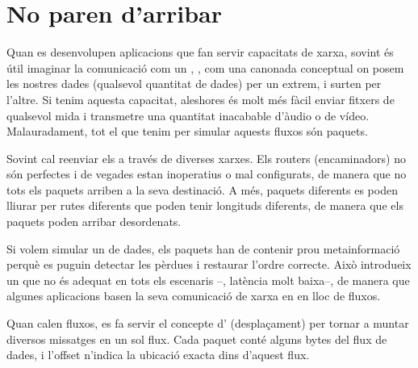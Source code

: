 \section{No paren d'arribar}\label{sec:packets:stream}

Quan es desenvolupen aplicacions que fan servir capacitats de xarxa, sovint és útil 
imaginar la comunicació com un , \ie, com una canonada conceptual on posem 
les nostres dades (qualsevol quantitat de dades) per un extrem, i surten per l'altre. Si tenim
aquesta capacitat, aleshores és molt més fàcil enviar fitxers de qualsevol mida i transmetre una quantitat
inacabable d'àudio o de vídeo. Malauradament, tot el que tenim per simular aquests fluxos són paquets.

Sovint cal reenviar els  a través de diverses xarxes. Els routers (encaminadors) no són perfectes
i de vegades estan inoperatius o mal configurats, de manera que no tots els paquets arriben a la seva destinació. A més,
paquets diferents es poden lliurar per rutes diferents que poden tenir longituds diferents, de manera que els paquets poden arribar
desordenats.

Si volem simular un  de dades, els paquets han de contenir prou metainformació perquè es puguin detectar les pèrdues i 
restaurar l'ordre correcte. Això introdueix un  que no és adequat en tots els escenaris --\eg, latència molt baixa--,
de manera que algunes aplicacions basen la seva comunicació de xarxa en  en lloc de fluxos.

Quan calen fluxos, es fa servir el concepte d' (desplaçament) per tornar a muntar diversos missatges en 
un sol flux. Cada paquet conté alguns bytes del flux de dades, i l'offset n'indica la ubicació exacta dins d'aquest flux.

